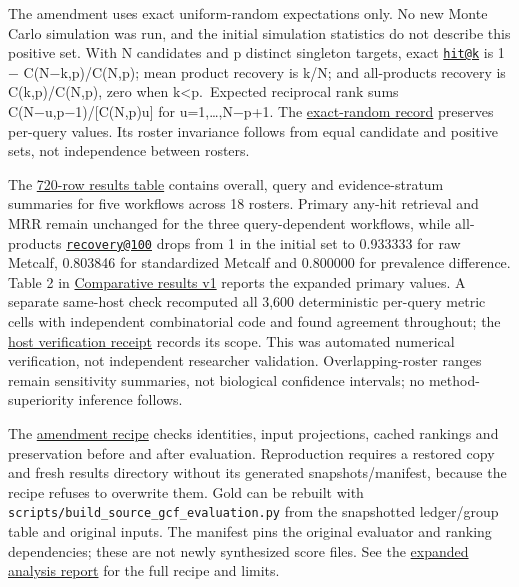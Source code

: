 \documentclass[
  10pt,
  a4paper,
]{article}
\begin{document}
The amendment uses exact uniform-random expectations only. No new Monte Carlo simulation was run, and the initial simulation statistics do not describe this positive set. With N candidates and p distinct singleton targets, exact \href{mailto:hit@k}{\nolinkurl{hit@k}} is 1 − C(N−k,p)/C(N,p); mean product recovery is k/N; and all-products recovery is C(k,p)/C(N,p), zero when k\textless p.~Expected reciprocal rank sums C(N−u,p−1)/{[}C(N,p)u{]} for u=1,\ldots,N−p+1. The \href{https://github.com/vinvomero/fungallink-benchmark/blob/main/data/processed/source-selected-gcf-expanded-labels-v2-results/exact-random.json}{exact-random record} preserves per-query values. Its roster invariance follows from equal candidate and positive sets, not independence between rosters.

The \href{https://github.com/vinvomero/fungallink-benchmark/blob/main/manuscript/expanded-label-results-2026-10-07.tsv}{720-row results table} contains overall, query and evidence-stratum summaries for five workflows across 18 rosters. Primary any-hit retrieval and MRR remain unchanged for the three query-dependent workflows, while all-products \href{mailto:recovery@100}{\nolinkurl{recovery@100}} drops from 1 in the initial set to 0.933333 for raw Metcalf, 0.803846 for standardized Metcalf and 0.800000 for prevalence difference. Table 2 in \href{Comparative-results.pdf}{Comparative results v1} reports the expanded primary values. A separate same-host check recomputed all 3,600 deterministic per-query metric cells with independent combinatorial code and found agreement throughout; the \href{https://github.com/vinvomero/fungallink-benchmark/blob/main/data/processed/source-selected-gcf-expanded-labels-v2-results/host-independent-verification.json}{host verification receipt} records its scope. This was automated numerical verification, not independent researcher validation. Overlapping-roster ranges remain sensitivity summaries, not biological confidence intervals; no method-superiority inference follows.

The \href{https://github.com/vinvomero/fungallink-benchmark/blob/main/data/processed/source-selected-gcf-expanded-labels-v2/evaluate_cached.py}{amendment recipe} checks identities, input projections, cached rankings and preservation before and after evaluation. Reproduction requires a restored copy and fresh results directory without its generated snapshots/manifest, because the recipe refuses to overwrite them. Gold can be rebuilt with \nolinkurl{scripts/build_source_gcf_evaluation.py} from the snapshotted ledger/group table and original inputs. The manifest pins the original evaluator and ranking dependencies; these are not newly synthesized score files. See the \href{https://github.com/vinvomero/fungallink-benchmark/blob/main/manuscript/expanded-label-results-2026-10-07.md}{expanded analysis report} for the full recipe and limits.
\end{document}
